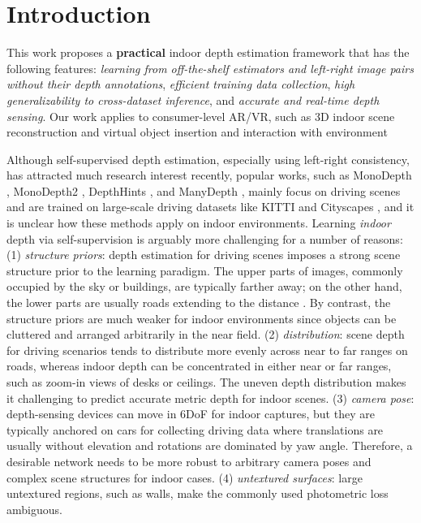 \documentclass[10pt,twocolumn,letterpaper]{article}
\begin{document}
\section{Introduction}
\label{intro}
This work proposes a \textbf{practical} indoor depth estimation framework that has the following features: \textit{learning from off-the-shelf estimators and left-right image pairs without their depth annotations}, \textit{efficient training data collection}, \textit{high generalizability to cross-dataset inference}, and \textit{accurate and real-time depth sensing}. 
Our work applies to consumer-level AR/VR, such as 3D indoor scene reconstruction and virtual object insertion and interaction with environment ~\cite{Occlusion2018}

Although self-supervised depth estimation, especially using left-right consistency, has attracted much research interest recently, popular works, such as MonoDepth \cite{godard2017unsupervised}, MonoDepth2 \cite{Godard_2019_ICCV}, DepthHints \cite{watson2019self}, and ManyDepth \cite{watson2021temporal}, mainly focus on driving scenes and are trained on large-scale driving datasets like KITTI \cite{geiger2012we} and Cityscapes \cite{Cordts2016Cityscapes}, and it is unclear how these methods apply on indoor environments. Learning \textit{indoor} depth via self-supervision is arguably more challenging for a number of reasons: (1) \textit{structure priors}: depth estimation for driving scenes imposes a strong scene structure prior to the learning paradigm. The upper parts of images, commonly occupied by the sky or buildings, are typically farther away; on the other hand, the lower parts are usually roads extending to the distance \cite{Dijk_2019_ICCV}. By contrast, the structure priors are much weaker for indoor environments since objects can be cluttered and arranged arbitrarily in the near field. (2) \textit{distribution}: scene depth for driving scenarios tends to distribute more evenly across near to far ranges on roads, whereas indoor depth can be concentrated in either near or far ranges, such as zoom-in views of desks or ceilings. The uneven depth distribution makes it challenging to predict accurate metric depth for indoor scenes. (3) \textit{camera pose}: depth-sensing devices can move in 6DoF for indoor captures, but they are typically anchored on cars for collecting driving data where translations are usually without elevation and rotations are dominated by yaw angle. Therefore, a desirable network needs to be more robust to arbitrary camera poses and complex scene structures for indoor cases. (4) \textit{untextured surfaces}: large untextured regions, such as walls, make the commonly used photometric loss ambiguous.
\end{document}
